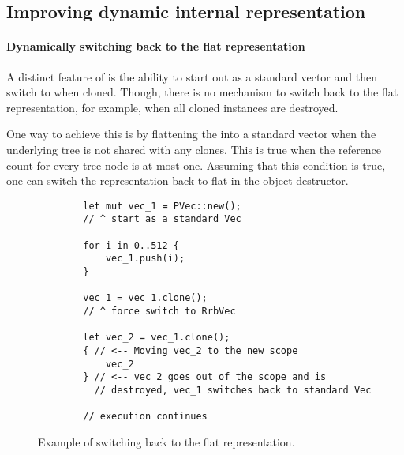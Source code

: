 \subsection{Improving dynamic internal representation}

\paragraph*{Dynamically switching back to the flat representation}
A distinct feature of \pvec{} is the ability to start out as a standard vector and then switch to \rrbvec{} when cloned. Though, there is no mechanism to switch back to the flat representation, for example, when all cloned instances are destroyed. 

One way to achieve this is by flattening the \rrbtree{} into a standard vector when the underlying tree is not shared with any clones. This is true when the reference count for every tree node is at most one. Assuming that this condition is true, one can switch the representation back to flat in the object destructor. 

\begin{figure}[!htbp] 
    \centering

    \begin{verbatim}
        let mut vec_1 = PVec::new();
        // ^ start as a standard Vec

        for i in 0..512 {
            vec_1.push(i);            
        }

        vec_1 = vec_1.clone();
        // ^ force switch to RrbVec

        let vec_2 = vec_1.clone();
        { // <-- Moving vec_2 to the new scope
            vec_2
        } // <-- vec_2 goes out of the scope and is 
          // destroyed, vec_1 switches back to standard Vec           

        // execution continues
    \end{verbatim}

    \caption{Example of switching back to the flat representation.}
    \label{fig:switching-to-flat}
\end{figure}


